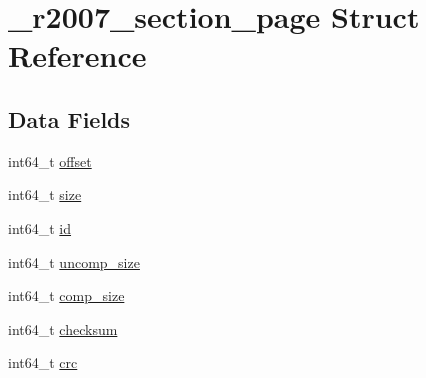 \hypertarget{struct__r2007__section__page}{\section{\-\_\-r2007\-\_\-section\-\_\-page \-Struct \-Reference}
\label{struct__r2007__section__page}
}
\subsection*{\-Data \-Fields}
\begin{DoxyCompactItemize}
\item 
int64\-\_\-t \hyperlink{struct__r2007__section__page_aab7ece762680af8de36c7720cb1941e2}{offset}
\item 
int64\-\_\-t \hyperlink{struct__r2007__section__page_a041ad864d0cd9efd3cf010ba79e15a94}{size}
\item 
int64\-\_\-t \hyperlink{struct__r2007__section__page_a6a302191431aef355c87c9bf94b7d015}{id}
\item 
int64\-\_\-t \hyperlink{struct__r2007__section__page_aee477bed59a2c80e0644c502ed195f80}{uncomp\-\_\-size}
\item 
int64\-\_\-t \hyperlink{struct__r2007__section__page_acf40138cbd9c339de46220ce541b87ea}{comp\-\_\-size}
\item 
int64\-\_\-t \hyperlink{struct__r2007__section__page_a32b9b77589311334eae51f2c7aee329b}{checksum}
\item 
int64\-\_\-t \hyperlink{struct__r2007__section__page_af946581ba943c9f54b3d847ee9c7112a}{crc}
\end{DoxyCompactItemize}


